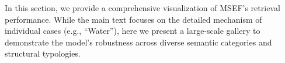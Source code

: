 \documentclass{article}
\newcommand{\cg}[1]{\begin{CJK*}{UTF8}{gbsn}#1\end{CJK*}}
\begin{document}



\label{app:gallery}

In this section, we provide a comprehensive visualization of MSEF's retrieval performance. While the main text focuses on the detailed mechanism of individual cases (e.g., ``Water''), here we present a large-scale gallery to demonstrate the model's robustness across diverse semantic categories and structural typologies.

\end{document}
